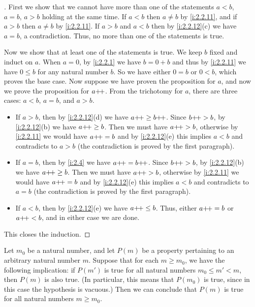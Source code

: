 \begin{proof}[]
  First we show that we cannot have more than one of the statements \(a < b\), \(a = b\), \(a > b\) holding at the same time.
  If \(a < b\) then \(a \neq b\) by \cref{i:2.2.11}, and if \(a > b\) then \(a \neq b\) by \cref{i:2.2.11}.
  If \(a > b\) and \(a < b\) then by \cref{i:2.2.12}(c) we have \(a = b\), a contradiction.
  Thus, no more than one of the statements is true.

  Now we show that at least one of the statements is true.
  We keep \(b\) fixed and induct on \(a\).
  When \(a = 0\), by \cref{i:2.2.1} we have \(b = 0 + b\) and thus by \cref{i:2.2.11} we have \(0 \leq b\) for any natural number \(b\).
  So we have either \(0 = b\) or \(0 < b\), which proves the base case.
  Now suppose we have proven the proposition for \(a\), and now we prove the proposition for \(a{+}\!{+}\).
  From the trichotomy for \(a\), there are three cases: \(a < b\), \(a = b\), and \(a > b\).
  \begin{itemize}
    \item If \(a > b\), then by \cref{i:2.2.12}(d) we have \(a{+}\!{+} \geq b{+}\!{+}\).
          Since \(b{+}\!{+} > b\), by \cref{i:2.2.12}(b) we have \(a{+}\!{+} \geq b\).
          Then we must have \(a{+}\!{+} > b\), otherwise by \cref{i:2.2.11} we would have \(a{+}\!{+} = b\) and by \cref{i:2.2.12}(e) this implies \(a < b\) and contradicts to \(a > b\)
          (the contradiction is proved by the first paragraph).
    \item If \(a = b\), then by \cref{i:2.4} we have \(a{+}\!{+} = b{+}\!{+}\).
          Since \(b{+}\!{+} > b\), by \cref{i:2.2.12}(b) we have \(a{+}\!{+} \geq b\).
          Then we must have \(a{+}\!{+} > b\), otherwise by \cref{i:2.2.11} we would have \(a{+}\!{+} = b\) and by \cref{i:2.2.12}(e) this implies \(a < b\) and contradicts to \(a = b\)
          (the contradiction is proved by the first paragraph).
    \item If \(a < b\), then by \cref{i:2.2.12}(e) we have \(a{+}\!{+} \leq b\).
          Thus, either \(a{+}\!{+} = b\) or \(a{+}\!{+} < b\), and in either case we are done.
  \end{itemize}
  This closes the induction.
\end{proof}

\begin{prop}\label{i:2.2.14}
  Let \(m_0\) be a natural number, and let \(P(m)\) be a property pertaining to an arbitrary natural number \(m\).
  Suppose that for each \(m \geq m_0\), we have the following implication: if \(P(m')\) is true for all natural numbers \(m_0 \leq m' < m\), then \(P(m)\) is also true.
  (In particular, this means that \(P(m_0)\) is true, since in this case the hypothesis is vacuous.)
  Then we can conclude that \(P(m)\) is true for all natural numbers \(m \geq m_0\).
\end{prop}

